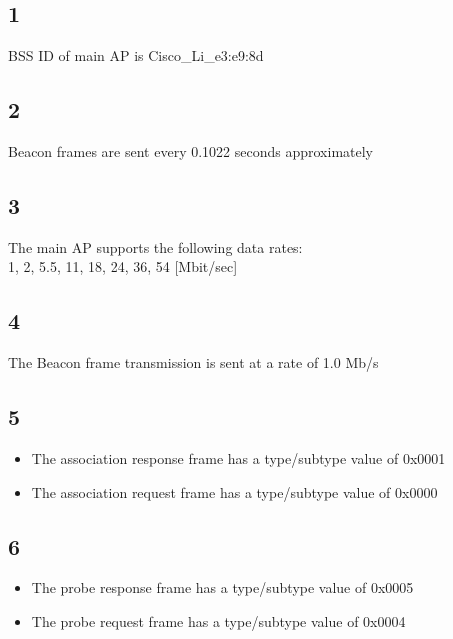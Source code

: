 \documentclass{article}
\begin{document}
    \subsection*{1}
        BSS ID of main AP is Cisco\_Li\_e3:e9:8d
    \subsection*{2}
        Beacon frames are sent every 0.1022 seconds approximately
    \subsection*{3}
        The main AP supports the following data rates:\\
        1, 2, 5.5, 11, 18, 24, 36, 54 [Mbit/sec]
    \subsection*{4}
        The Beacon frame transmission is sent at a rate of 1.0 Mb/s
    \subsection*{5}
        \begin{itemize}
            \item The association response frame has a type/subtype value of 0x0001
            \item The association request frame has a type/subtype value of 0x0000
        \end{itemize}
    \subsection*{6}
        \begin{itemize}
            \item The probe response frame has a type/subtype value of 0x0005
            \item The probe request frame has a type/subtype value of 0x0004
        \end{itemize}
\end{document}
